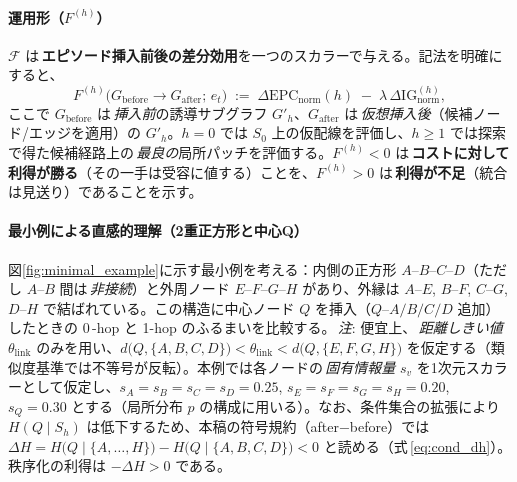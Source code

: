 \documentclass[ja=standard,xelatex]{bxjsarticle}
\newcommand{\F}{\mathcal{F}}
\begin{document}
\paragraph{運用形（$F^{(h)}$）}
\noindent $\F$ は\,\textbf{エピソード挿入前後の差分効用}を一つのスカラーで与える。記法を明確にすると、
\begin{equation}
  F^{(h)}\big( G_{\mathrm{before}}\!\to G_{\mathrm{after}};\, e_t \big)\;:=\; \Delta\mathrm{EPC}_{\mathrm{norm}}(h)\; -\; \lambda\,\Delta\mathrm{IG}_{\mathrm{norm}}^{(h)},\label{eq:F_eval_mapping}
\end{equation}
ここで $G_{\mathrm{before}}$ は\,\emph{挿入前}の誘導サブグラフ $G'_h$、$G_{\mathrm{after}}$ は\,\emph{仮想挿入後}（候補ノード/エッジを適用）の $G'_h$。$h{=}0$ では $S_0$ 上の仮配線を評価し、$h\ge1$ では探索で得た候補経路上の\,\emph{最良の}局所パッチを評価する。$F^{(h)}{<}0$ は\,\textbf{コストに対して利得が勝る}（その一手は受容に値する）ことを、$F^{(h)}{>}0$ は\,\textbf{利得が不足}（統合は見送り）であることを示す。



\paragraph{最小例による直感的理解（2重正方形と中心Q）}
図\ref{fig:minimal_example}に示す最小例を考える：内側の正方形 $A$–$B$–$C$–$D$（ただし $A$–$B$ 間は\,\emph{非接続}）と外周ノード $E$–$F$–$G$–$H$ があり、外縁は $A$–$E$, $B$–$F$, $C$–$G$, $D$–$H$ で結ばれている。この構造に中心ノード $Q$ を挿入（$Q$–$A/B/C/D$ 追加）したときの 0\,\mbox{-}hop と 1-hop のふるまいを比較する。\,\textit{注}: 便宜上、\,\emph{距離しきい値} $\theta_{\mathrm{link}}$ のみを用い、$d\big(Q,\{A,B,C,D\}\big){<}\theta_{\mathrm{link}}{<}d\big(Q,\{E,F,G,H\}\big)$ を仮定する（類似度基準では不等号が反転）。本例では各ノードの\,\emph{固有情報量} $s_v$ を1次元スカラーとして仮定し、$s_A{=}s_B{=}s_C{=}s_D{=}0.25$, $s_E{=}s_F{=}s_G{=}s_H{=}0.20$, $s_Q{=}0.30$ とする（局所分布 $p$ の構成に用いる）。なお、条件集合の拡張により $H(Q\mid S_h)$ は低下するため、本稿の符号規約（after−before）では $\Delta H = H\big(Q\mid \{A,\dots,H\}\big) - H\big(Q\mid \{A,B,C,D\}\big) < 0$ と読める（式\,\ref{eq:cond_dh}）。秩序化の利得は $-\Delta H > 0$ である。
\end{document}
